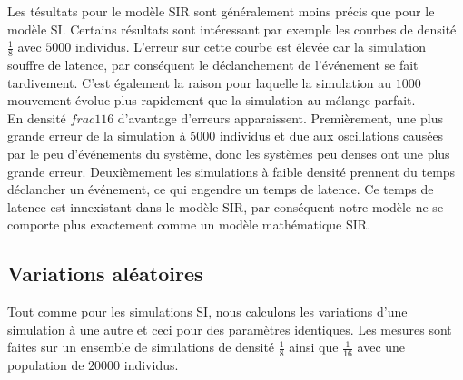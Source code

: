 Les tésultats pour le modèle SIR sont généralement moins précis que pour le modèle SI. Certains résultats sont intéressant par exemple les courbes de densité $\frac{1}{8}$ avec $5000$ individus. L'erreur sur cette courbe est élevée car la simulation souffre de latence, par conséquent le déclanchement de l'événement se fait tardivement. C'est également la raison pour laquelle la simulation au $1000$ mouvement évolue plus rapidement que la simulation au mélange parfait.\\

En densité $frac{1}{16}$ d'avantage d'erreurs apparaissent. Premièrement, une plus grande erreur de la simulation à $5000$ individus et due aux oscillations causées par le peu d'événements du système, donc les systèmes peu denses ont une plus grande erreur. Deuxièmement les simulations à faible densité prennent du temps déclancher un événement, ce qui engendre un temps de latence. Ce temps de latence est innexistant dans le modèle SIR, par conséquent notre modèle ne se comporte plus exactement comme un modèle mathématique SIR.

\newpage

\subsection{Variations aléatoires}

Tout comme pour les simulations SI, nous calculons les variations d'une simulation à une autre et ceci pour des paramètres identiques. Les mesures sont faites sur un ensemble de simulations de densité $\frac{1}{8}$ ainsi que $\frac{1}{16}$ avec une population de $20000$ individus.

